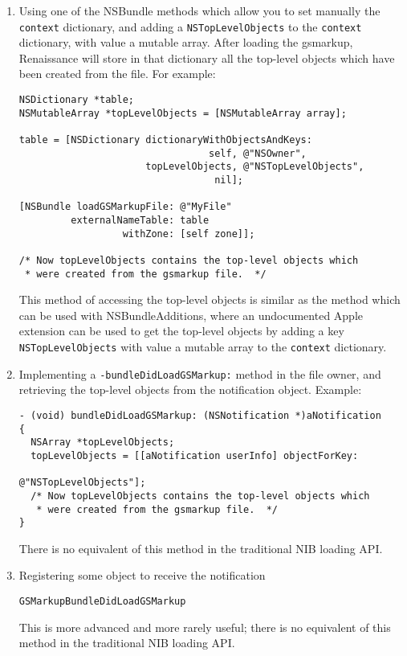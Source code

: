 \begin{enumerate}
\item Using one of the NSBundle methods which allow you to set manually
the \texttt{context} dictionary, and adding a
\texttt{NSTopLevelObjects} to the \texttt{context} dictionary, with
value a mutable array.  After loading the gsmarkup, Renaissance will
store in that dictionary all the top-level objects which have been
created from the file.  For example:
\begin{verbatim}
NSDictionary *table;
NSMutableArray *topLevelObjects = [NSMutableArray array];

table = [NSDictionary dictionaryWithObjectsAndKeys: 
                                 self, @"NSOwner",
                      topLevelObjects, @"NSTopLevelObjects",
                                  nil];

[NSBundle loadGSMarkupFile: @"MyFile"
         externalNameTable: table
                  withZone: [self zone]];

/* Now topLevelObjects contains the top-level objects which
 * were created from the gsmarkup file.  */
\end{verbatim}
This method of accessing the top-level objects is similar as the
method which can be used with NSBundleAdditions, where an undocumented
Apple extension can be used to get the top-level objects by adding a
key \texttt{NSTopLevelObjects} with value a mutable array to the
\texttt{context} dictionary.

\item Implementing a \texttt{-bundleDidLoadGSMarkup:} method in the
file owner, and retrieving the top-level objects from the notification
object.  Example:
\begin{verbatim}
- (void) bundleDidLoadGSMarkup: (NSNotification *)aNotification
{
  NSArray *topLevelObjects;
  topLevelObjects = [[aNotification userInfo] objectForKey: 
                                                  @"NSTopLevelObjects"];
  /* Now topLevelObjects contains the top-level objects which
   * were created from the gsmarkup file.  */
}
\end{verbatim}
There is no equivalent of this method in the traditional NIB loading API.

\item Registering some object to receive the notification
\begin{verbatim}
GSMarkupBundleDidLoadGSMarkup
\end{verbatim}
This is more advanced and more rarely useful; there is no equivalent
of this method in the traditional NIB loading API.
\end{enumerate}

